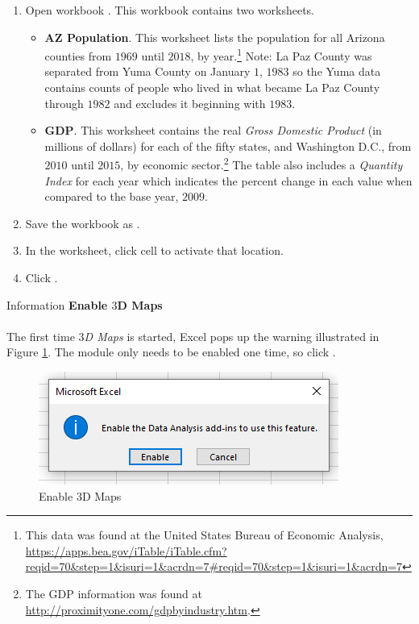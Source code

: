 \begin{enumbox}
	\begin{enumerate}
		\item Open workbook . This workbook contains two worksheets.	
		\begin{itemize}
			\item \textbf{AZ Population}. This worksheet lists the population for all Arizona counties from $ 1969 $ until $ 2018 $, by year.\footnote{This data was found at the United States Bureau of Economic Analysis, \url{https://apps.bea.gov/iTable/iTable.cfm?reqid=70&step=1&isuri=1&acrdn=7\#reqid=70&step=1&isuri=1&acrdn=7}} Note: La Paz County was separated from Yuma County on January $ 1 $, $ 1983 $ so the Yuma data contains counts of people who lived in what became La Paz County through $ 1982 $ and excludes it beginning with $ 1983 $.
			\item \textbf{GDP}. This worksheet contains the real \textit{Gross Domestic Product} (in millions of dollars) for each of the fifty states, and Washington D.C., from $ 2010 $ until $ 2015 $, by economic sector.\footnote{The GDP information was found at \url{http://proximityone.com/gdpbyindustry.htm}.} The table also includes a \textit{Quantity Index} for each year which indicates the percent change in each value when compared to the base year, $ 2009 $.
		\end{itemize}
		\item Save the workbook as .
		\item In the  worksheet, click cell  to activate that location.
		\item Click .
	\end{enumerate}
\end{enumbox}

\begin{center}
	\begin{infobox}{Information}
		\textbf{Enable $ 3 $D Maps}
		\\
		\\
		The first time \textit{$ 3 $D Maps} is started, Excel pops up the warning illustrated in Figure \ref{08:fig20}. The module only needs to be enabled one time, so click .

		\begin{figure}[H]
			\centering
			\includegraphics[width=\maxwidth{.85\linewidth}]{gfx/ch08_fig20}
			\caption{Enable $ 3 $D Maps}
			\label{08:fig20}
		\end{figure}

	\end{infobox}
\end{center}

